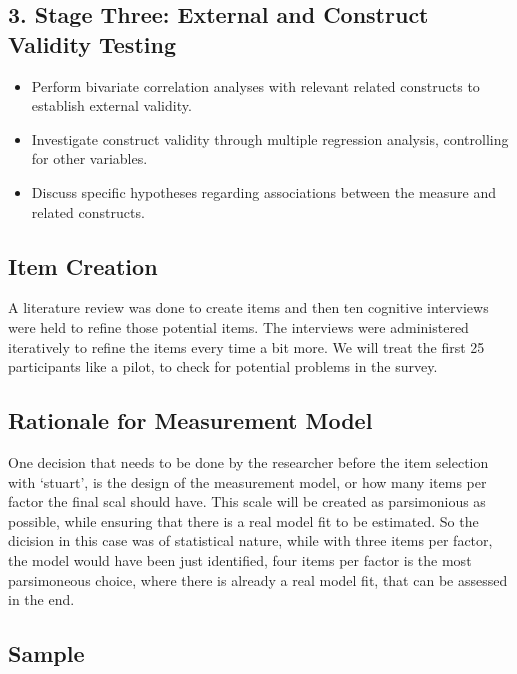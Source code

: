 \documentclass[
  12pt,
  a4paper,
  twoside]{article}
\providecommand{\tightlist}{%
  \setlength{\itemsep}{0pt}\setlength{\parskip}{0pt}}
\begin{document}
\subsection{3. Stage Three: External and Construct Validity
Testing}\label{stage-three-external-and-construct-validity-testing}

\begin{itemize}
\tightlist
\item
  Perform bivariate correlation analyses with relevant related
  constructs to establish external validity.
\item
  Investigate construct validity through multiple regression analysis,
  controlling for other variables.
\item
  Discuss specific hypotheses regarding associations between the measure
  and related constructs.
\end{itemize}

\subsection{Item Creation}\label{item-creation}

A literature review was done to create items and then ten cognitive
interviews were held to refine those potential items. The interviews
were administered iteratively to refine the items every time a bit more.
We will treat the first 25 participants like a pilot, to check for
potential problems in the survey.

\subsection{Rationale for Measurement
Model}\label{rationale-for-measurement-model}

One decision that needs to be done by the researcher before the item
selection with `stuart', is the design of the measurement model, or how
many items per factor the final scal should have. This scale will be
created as parsimonious as possible, while ensuring that there is a real
model fit to be estimated. So the dicision in this case was of
statistical nature, while with three items per factor, the model would
have been just identified, four items per factor is the most
parsimoneous choice, where there is already a real model fit, that can
be assessed in the end.

\subsection{Sample}\label{sample}
\end{document}

